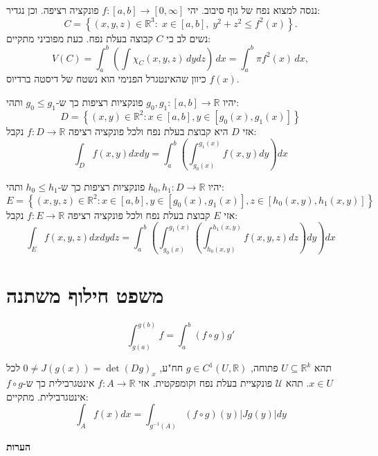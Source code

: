 \documentclass{tstextbook}
\begin{document}
\begin{example}
ננסה למצוא נפח של גוף סיבוב. יהי \(f:[a,b]\to\left[ 0,\infty \right]\) פונקציה רציפה. וכן נגדיר:
$$C=\left\{(x,y,z)\in\mathbb{R}^{3}:\;x\in[a,b],\;y^{2}+z^{2}\leq f^{2}(x)\right\}.$$
נשים לב כי \(C\) קבוצה בעלת נפח. כעת מפוביני מתקיים:
$$V(C)=\int_{a}^{b}\left(\int\chi_{C}(x,y,z)\,d y d z\right)\,d x=\int_{a}^{b}\pi f^{2}(x)\,d x,$$
כיוון שהאינטגרל הפנימי הוא נשטח של דיסטה ברדיוס \(f(x)\). 

\end{example}
\begin{corollary}
יהיו \(g_{0},g_{1}:[a,b]\to \mathbb{R}\) פונקציות רציפות כך ש-\(g_{0}\leq g_{1}\) ותהי:
$$D=\left\{\left(x,y\right)\in\mathbb{R}^{2}:x\in\left[a,b\right],y\in\left[g_{0}\left(x\right),g_{1}\left(x\right)\right]\right\}$$
אזי \(D\) היא קבוצת בעלת נפח ולכל פונקציה רציפה \(f:D\to\mathbb{R}\) נקבל:
$$\int_{D}f\left(x,y\right)d x d y=\int_{a}^{b}\left(\int_{g_{0}\left(x\right)}^{g_{1}\left(x\right)}f\left(x,y\right)d y\right)d x$$

\end{corollary}
\begin{corollary}
יהיו \(h_{0},h_{1}:D\to\mathbb{R}\) פונקציות רציפות כך ש-\(h_{0}\leq h_{1}\) ותהי:
$$E=\left\{\left(x,y,z\right)\in\mathbb{R}^{2}:x\in\left[a,b\right],y\in\left[g_{0}\left(x\right),g_{1}\left(x\right)\right],z\in\left[h_{0}\left(x,y\right),h_{1}\left(x,y\right)\right]\right\}$$
אזי \(E\) קבוצת בעלת נפח ולכל פונקציה רציפה \(f:E\to\mathbb{R}\) נקבל:
$$\int_{E}f\left(x,y,z\right)d x d y d z=\int_{a}^{b}\left(\int_{g_{0}\left(x\right)}^{g_{1}\left(x\right)}\left(\int_{h_{0}\left(x,y\right)}^{h_{1}\left(x,y\right)}f\left(x,y,z\right)d z\right)d y\right)d x$$

\end{corollary}
\section{משפט חילוף משתנה}

\begin{theorem}
$$\int_{g(a)}^{g(b)} f=\int_{a}^{b}\left( f\circ g \right)g'$$

\end{theorem}
\begin{theorem}
תהא \(U\subseteq \mathbb{R}^k\) פתוחה, \(g\in C^1\left( U,\mathbb{R} \right)\) חח"ע, \(0\neq J(g(x))=\det(Dg)_{x}\) לכל \(x \in U\).
תהא \(\mathcal{U}\) פונקציית בעלת נפח וקומפקטית. אזי \(f:A\to\mathbb{R}\) אינטגרבילית כך ש-\(f\circ g\) אינטגרבילית. מתקיים:
$$\int_{A} f(x)dx=\int_{g^{-1}(A)}\left( f\circ g \right)(y)|Jg(y)|dy$$

\end{theorem}
\textbf{הערות}
\end{document}
